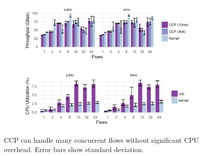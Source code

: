 \begin{figure}[t]
\centering
    \begin{subfigure}{0.48\textwidth}
        \centering
        \includegraphics[width=\columnwidth]{img/tputs}
        \label{fig:eval:perf:numflows}
    \end{subfigure}
    \begin{subfigure}{0.48\textwidth}
        \centering
        \includegraphics[width=\columnwidth]{img/10G_cpu_util_new}
        \label{fig:eval:perf:10g}
    \end{subfigure}
    \caption{CCP can handle many concurrent flows without significant CPU overhead. Error bars show standard deviation.}\label{fig:eval:perf}
\end{figure}

